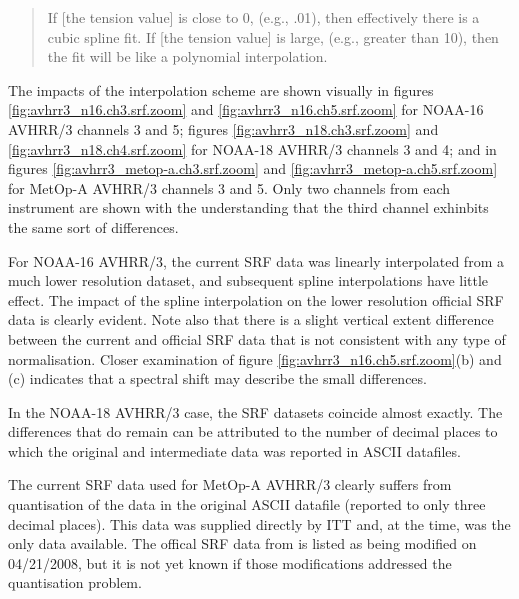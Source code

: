 \begin{quote}
If [the tension value] is close to 0, (e.g., .01), then effectively there is a cubic spline fit. If [the tension value] is large, (e.g., greater than 10), then the fit will be like a polynomial interpolation.
\end{quote}

The impacts of the interpolation scheme are shown visually in figures \ref{fig:avhrr3_n16.ch3.srf.zoom} and \ref{fig:avhrr3_n16.ch5.srf.zoom} for NOAA-16 AVHRR/3 channels 3 and 5; figures \ref{fig:avhrr3_n18.ch3.srf.zoom} and \ref{fig:avhrr3_n18.ch4.srf.zoom} for NOAA-18 AVHRR/3 channels 3 and 4; and in figures \ref{fig:avhrr3_metop-a.ch3.srf.zoom} and \ref{fig:avhrr3_metop-a.ch5.srf.zoom} for MetOp-A AVHRR/3 channels 3 and 5. Only two channels from each instrument are shown with the understanding that the third channel exhinbits the same sort of differences.

For NOAA-16 AVHRR/3, the current SRF data was linearly interpolated from a much lower resolution dataset, and subsequent spline interpolations have little effect. The impact of the spline interpolation on the lower resolution official SRF data is clearly evident. Note also that there is a slight vertical extent difference between the current and official SRF data that is not consistent with any type of normalisation. Closer examination of figure \ref{fig:avhrr3_n16.ch5.srf.zoom}(b) and (c) indicates that a spectral shift may describe the small differences.

In the NOAA-18 AVHRR/3 case, the SRF datasets coincide almost exactly. The differences that do remain can be attributed to the number of decimal places to which the original and intermediate data was reported in ASCII datafiles.

The current SRF data used for MetOp-A AVHRR/3 clearly suffers from quantisation of the data in the original ASCII datafile (reported to only three decimal places). This data was supplied directly by ITT \citep{Sullivan_avhrr3_metop-a_srf} and, at the time, was the only data available. The offical SRF data from \citet{NESDIS_AVHRR_SRFs} is listed as being modified on 04/21/2008, but it is not yet known if those modifications addressed the quantisation problem.


